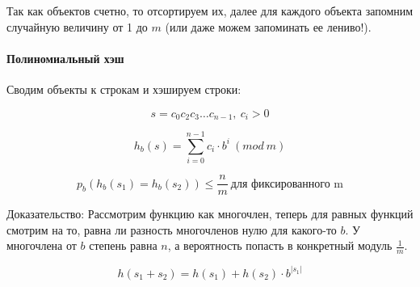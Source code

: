 \documentclass[12pt]{article}
\newcommand{\rangesum}[2]{\displaystyle \sum_{#1}^{#2}}
\begin{document}
Так как объектов счетно, то отсортируем их, далее для каждого объекта запомним случайную величину от 1 до $m$ (или даже можем запоминать ее лениво!).

\paragraph{Полиномиальный хэш}

Сводим объекты к строкам и хэшируем строки:

$$s = c_0c_2c_3 \dots c_{n-1},\ c_i > 0$$

$$h_b(s) = \rangesum{i=0}{n-1} c_i \cdot b^i\ (mod\ m)$$

$$p_b(h_b(s_1) = h_b(s_2)) \le \frac{n}{m}\ \text{для фиксированного m}$$

Доказательство: Рассмотрим функцию как многочлен, теперь для равных функций смотрим на то, равна ли разность многочленов нулю для какого-то $b$. У многочлена от $b$ степень равна $n$, а вероятность попасть в конкретный модуль $\frac{1}{m}$.

$$h(s_1 + s_2) = h(s_1) + h(s_2) \cdot b^{|s_1|}$$
\end{document}
